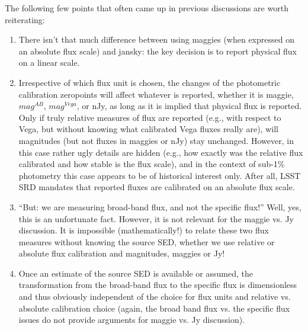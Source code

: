 \documentclass[DM,toc]{lsstdoc}
\begin{document}
The following few points that often came up in previous discussions are worth reiterating:
\begin{enumerate}
\item There isn't that much difference between using maggies (when expressed on an
absolute flux scale) and jansky: the key decision is to report physical flux on a linear scale.
\item Irrespective of which flux unit is chosen, the changes of the photometric
calibration zeropoints will affect whatever is reported, whether it is maggie, $mag^{AB}$,
$mag^{Vega}$, or nJy, as long as it is implied that physical flux is reported. Only if
truly relative measures of flux are reported (e.g., with respect to Vega, but without knowing
what calibrated Vega fluxes really are), will magnitudes (but not fluxes in maggies or
nJy) stay unchanged. However, in this case rather ugly details are hidden (e.g., how
exactly was the relative flux calibrated and how stable is the flux scale), and in the context
of sub-1\% photometry this case appears to be of historical interest only. After all,
LSST SRD mandates that reported fluxes are calibrated on an absolute flux scale.
\item ``But: we are measuring broad-band flux, and not the specific flux!''  Well,
yes, this is an unfortunate fact. However, it is not relevant for the maggie vs. Jy discussion.
It is impossible (mathematically!) to relate these two flux measures without knowing
the source SED, whether we use relative or absolute flux calibration and magnitudes,
maggies or Jy!
\item Once an estimate of the source SED is available or assumed, the transformation from
the broad-band flux to the specific flux is dimensionless and thus obviously independent
of the choice for flux units and relative vs. absolute calibration choice (again, the broad band
flux vs. the specific flux issues do not provide arguments for maggie vs. Jy discussion).
\end{enumerate}
\end{document}
